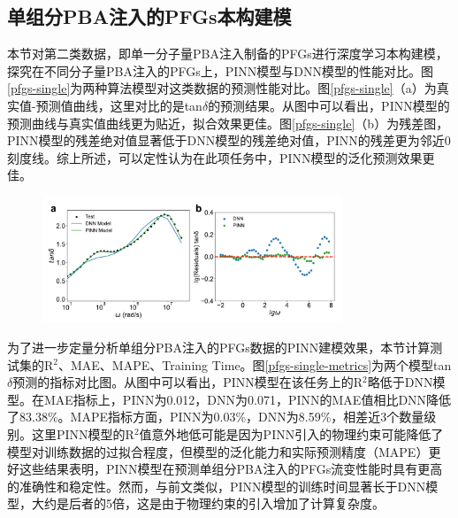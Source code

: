 \subsection{单组分PBA注入的PFGs本构建模}
本节对第二类数据，即单一分子量PBA注入制备的PFGs进行深度学习本构建模，探究在不同分子量PBA注入的PFGs上，PINN模型与DNN模型的性能对比。图\ref{pfgs-single}为两种算法模型对这类数据的预测性能对比。图\ref{pfgs-single}（a）为真实值-预测值曲线，这里对比的是tan$\delta$的预测结果。从图中可以看出，PINN模型的预测曲线与真实值曲线更为贴近，拟合效果更佳。图\ref{pfgs-single}（b）为残差图，PINN模型的残差绝对值显著低于DNN模型的残差绝对值，PINN的残差更为邻近0刻度线。综上所述，可以定性认为在此项任务中，PINN模型的泛化预测效果更佳。
\begin{figure}[htbp]
  \centering
  \includegraphics[width=0.8\textwidth]{Fig/pfgs-single.pdf}
\end{figure}
为了进一步定量分析单组分PBA注入的PFGs数据的PINN建模效果，本节计算测试集的R$^2$、MAE、MAPE、Training Time。图\ref{pfgs-single-metrics}为两个模型tan$\delta$预测的指标对比图。从图中可以看出，PINN模型在该任务上的R$^2$略低于DNN模型。在MAE指标上，PINN为0.012，DNN为0.071，PINN的MAE值相比DNN降低了83.38\%。MAPE指标方面，PINN为0.03\%，DNN为8.59\%，相差近3个数量级别。这里PINN模型的R$^2$值意外地低可能是因为PINN引入的物理约束可能降低了模型对训练数据的过拟合程度，但模型的泛化能力和实际预测精度（MAPE）更好这些结果表明，PINN模型在预测单组分PBA注入的PFGs流变性能时具有更高的准确性和稳定性。然而，与前文类似，PINN模型的训练时间显著长于DNN模型，大约是后者的5倍，这是由于物理约束的引入增加了计算复杂度。
